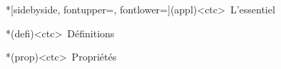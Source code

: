 \documentclass[../../main/main.tex]{subfiles}
\begin{document}

\newpage

\vspace*{\fill}
\begin{tcn}*[sidebyside, fontupper=\small, fontlower=\small](appl)<ctc>{\iconchek~L'essentiel}
	\begin{tcn}*(defi)<ctc>{\icondefi~Définitions}
	\end{tcn}
	\begin{tcn}*(prop)<ctc>{\iconprop~Propriétés}
	\end{tcn}

\end{tcn}
\end{document}
